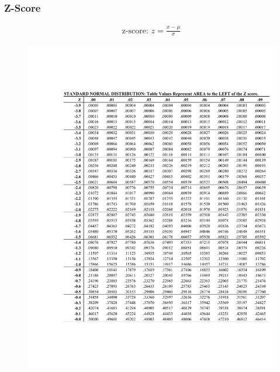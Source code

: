 \documentclass[12pt]{article}
\numberwithin{equation}{section}
\begin{document}
\subsubsection{Z-Score}
\begin{gather}
    \text{z-score: } z = \frac{x-\mu}{\sigma}
\end{gather}

\begin{figure}[!ht]
    \centering
    \includegraphics[page=1, width=0.9\linewidth, trim=4cm 4cm 1.25cm 4cm]{figures and tables/standardnormaltable.pdf}
    \label{zscore}
\end{figure}
\end{document}
